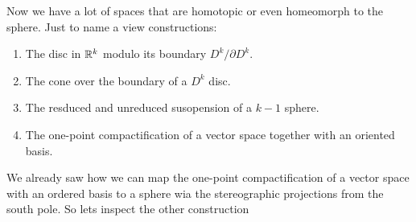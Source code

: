 Now we have a lot of spaces that are homotopic or even homeomorph to the sphere. Just to name a view constructions:
\begin{enumerate}
	\item The disc in $\mathbb{R}^k$ modulo its boundary $D^k\slash \partial D^k$.
	\item The cone over the boundary of a $D^k$ disc. 
	\item The resduced and unreduced susopension of a $k-1$ sphere. 
	\item The one-point compactification of a vector space together with an oriented basis.
\end{enumerate}
We already saw how we can map the one-point compactification of a vector space with an ordered basis to a sphere wia the stereographic projections from the south pole. 
So lets inspect the other construction
